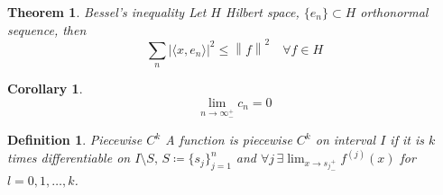 \documentclass{article}
\newtheorem{theorem}{Theorem}
\newtheorem{definition}{Definition}
\newtheorem{corollary}{Corollary}[theorem]
\newcommand{\norm}[1]{\left\lVert#1\right\rVert}
\begin{document}
\begin{theorem}{Bessel's inequality}
	Let $H$ Hilbert space, $\{e_n\} \subset H$ orthonormal sequence, then
	$$ \sum_n \lvert \langle x, e_n \rangle \rvert^2 \le \norm{f}^2 \quad \forall f \in H $$
\end{theorem}

\begin{corollary}
	$$ \lim_{n \to \infty_-^+} c_n = 0 $$
\end{corollary}

\begin{definition}{Piecewise $C^k$}
	A function is piecewise $C^k$ on interval $I$ if it is $k$ times differentiable
	on $I \setminus S, \, S \coloneqq \{s_j\}_{j=1}^n$
	and $\forall j \, \exists \lim_{x \to {s_j}_-^+} f^{(j)}(x)$ for $l = 0, 1, \ldots, k$.
\end{definition}
\end{document}

